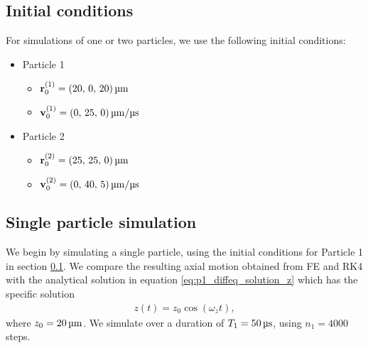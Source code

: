 \subsection{Initial conditions}\label{sec:initial_conditions}
For simulations of one or two particles, we use the following initial conditions:
\begin{itemize}
    \item Particle 1\label{item:initial_conditions_p1}
    \begin{itemize}
        \item[] $\vec{r}^{(1)}_0 = (20, \,0, \,20) \, \mathrm{\text{\textmu}m} $
        \item[] $\vec{v}^{(1)}_0 = (0,\,25,\,0) \, \mathrm{\text{\textmu}m}/ \mathrm{\text{\textmu}s}$
    \end{itemize}
    \item Particle 2\label{item:initial_conditions_p2}
    \begin{itemize}
        \item[] $\vec{r}^{(2)}_0 = (25, \,25, \,0) \, \mathrm{\text{\textmu}m} $
        \item[] $\vec{v}^{(2)}_0 = (0,\,40,\,5) \, \mathrm{\text{\textmu}m}/ \mathrm{\text{\textmu}s}$
    \end{itemize}
\end{itemize}



\subsection{Single particle simulation}\label{sec:simulation}
We begin by simulating a single particle, using the initial conditions for Particle 1 in section \ref{sec:initial_conditions}. We compare the resulting axial motion obtained from FE and RK4 with the analytical solution in equation \eqref{eq:p1_diffeq_solution_z} which has the specific solution 
\begin{align}
    z(t) = z_0 \cos(\omega_z t), \label{eq:z_spec_analytical_solution}
\end{align}
where $z_0=20\,\mum$. We simulate over a duration of $T_1=50\,\mus$, using $n_1=4000$ steps. 

